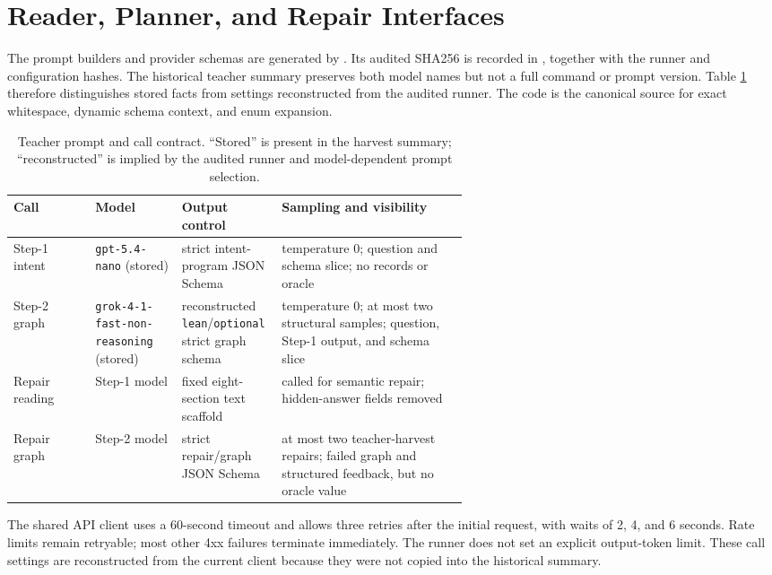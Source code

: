 \section{Reader, Planner, and Repair Interfaces}
\label{app:prompts}

The prompt builders and provider schemas are generated by
.  Its audited SHA256 is recorded in
, together with the runner and
configuration hashes.  The historical teacher summary preserves both model names but not a full
command or prompt version.  Table \ref{tab:teacher-call-contract} therefore distinguishes stored
facts from settings reconstructed from the audited runner.  The code is the canonical source for
exact whitespace, dynamic schema context, and enum expansion.

\begin{table}[h]
  \centering
  \caption{Teacher prompt and call contract.  ``Stored'' is present in the harvest summary;
  ``reconstructed'' is implied by the audited runner and model-dependent prompt selection.}
  \label{tab:teacher-call-contract}
  \small
  \begin{tabularx}{\linewidth}{p{0.18\linewidth}p{0.19\linewidth}p{0.22\linewidth}X}
    \toprule
    Call & Model & Output control & Sampling and visibility \\
    \midrule
    Step-1 intent & \texttt{gpt-5.4-nano} (stored) & strict intent-program JSON Schema & temperature 0; question and schema slice; no records or oracle \\
    Step-2 graph & \texttt{grok-4-1-fast-}\newline\texttt{non-reasoning} (stored) & reconstructed \texttt{lean}/\texttt{optional} strict graph schema & temperature 0; at most two structural samples; question, Step-1 output, and schema slice \\
    Repair reading & Step-1 model & fixed eight-section text scaffold & called for semantic repair; hidden-answer fields removed \\
    Repair graph & Step-2 model & strict repair/graph JSON Schema & at most two teacher-harvest repairs; failed graph and structured feedback, but no oracle value \\
    \bottomrule
  \end{tabularx}
\end{table}

The shared API client uses a 60-second timeout and allows three retries after the initial request,
with waits of 2, 4, and 6 seconds.  Rate limits remain retryable; most other 4xx failures terminate
immediately.  The runner does not set an explicit output-token limit.  These call settings are
reconstructed from the current client because they were not copied into the historical summary.

